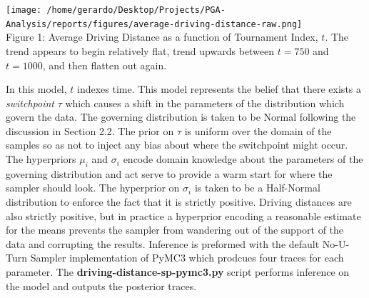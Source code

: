 \documentclass[11pt]{article}
\begin{document}
\begin{center}
    \texttt{[image: /home/gerardo/Desktop/Projects/PGA-Analysis/reports/figures/average-driving-distance-raw.png]}\\
    Figure 1: Average Driving Distance as a function of Tournament Index, $t$. The trend appears to begin relatively flat, trend upwards between $t=750$ and $t=1000$, and then flatten out again. 
\end{center}
\begin{multicols}{2}
In this model, $t$ indexes time. This model represents the belief that there exists a \textit{switchpoint} $\tau$ which causes a shift in the parameters of the distribution which govern the data. The governing distribution is taken to be Normal following the discussion in Section 2.2. The prior on $\tau$ is uniform over the domain of the samples so as not to inject any bias about where the switchpoint might occur. The hyperpriors $\mu_i$ and $\sigma_i$ encode domain knowledge about the parameters of the governing distribution and act serve to provide a warm start for where the sampler should look. The hyperprior on $\sigma_i$ is taken to be a Half-Normal distribution to enforce the fact that it is strictly positive. Driving distances are also strictly positive, but in practice a hyperprior encoding a reasonable estimate for the means prevents the sampler from wandering out of the support of the data and corrupting the results. Inference is preformed with the default No-U-Turn Sampler implementation of PyMC3 which prodcues four traces for each parameter. The \textbf{driving-distance-sp-pymc3.py} script performs inference on the model and outputs the posterior traces. 
\end{multicols}
\end{document}
